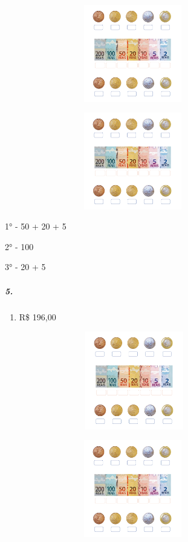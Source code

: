 \includegraphics[width=4.40625in,height=1.66152in]{media/image72.png}

\includegraphics[width=4.40625in,height=1.66152in]{media/image72.png}

1° - 50 + 20 + 5

2° - 100

3° - 20 + 5

\subparagraph{5.}\label{section-60}

\begin{enumerate}
\def\labelenumi{\alph{enumi})}
\item
  R\$ 196,00
\end{enumerate}

\includegraphics[width=4.45833in,height=1.68116in]{media/image72.png}

\includegraphics[width=4.40625in,height=1.66152in]{media/image72.png}

